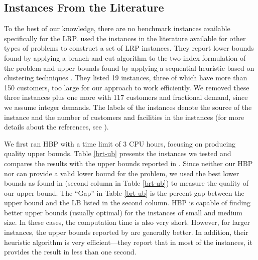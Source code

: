 \documentclass[graybox]{./styles/svmult}
\begin{document}
\subsection{Instances From the Literature}
To the best of our knowledge, there are no benchmark instances
available specifically for the LRP. \citet{Barreto07} used the
instances in the literature available for other types of problems to
construct a set of LRP instances. They report lower bounds found by
applying a branch-and-cut algorithm to the two-index formulation of
the problem \citep{Barreto04} and upper bounds found by applying
a sequential heuristic based on clustering techniques
\citep{Barreto07}. They listed 19 instances, three of which have
more than 150 customers, too large for our approach to work
efficiently. We removed these three instances plus one more with 117
customers and fractional demand, since we assume integer demands. The
labels of the instances denote the source of the instance and the
number of customers and facilities in the instances
(for more details about the references, see \citet{Barreto-data}).

We first ran HBP with a time limit of 3 CPU hours, focusing on
producing quality upper bounds. 
Table \ref{brt-ub} presents the instances we tested and compares the
results with the upper bounds reported in \citet{Barreto07}. Since
neither our HBP nor \citet{Barreto07} can provide a valid lower bound
for the problem, we used the best lower bounds as found in
\citet{Barreto04} (second column in Table \ref{brt-ub}) to measure the
quality of our upper bound. The ``Gap'' in Table \ref{brt-ub} is the
percent gap between the upper bound and the LB listed in the second column. HBP
is capable of finding better upper bounds (usually optimal) for the
instances of small and medium size. In these cases, the computation
time is also very short. However, for larger instances, the upper
bounds reported by \citet{Barreto07} are generally better. In
addition, their heuristic algorithm is very efficient---they report
that in most of the instances, it provides the result in less than one
second.
\end{document}
